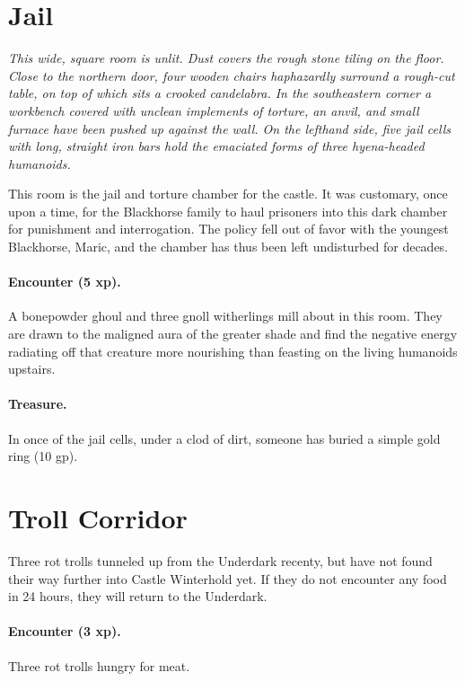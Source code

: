 \section{Jail}

\textit{This wide, square room is unlit. Dust covers the rough stone tiling on the floor.
Close to the northern door, four wooden chairs haphazardly surround a rough-cut table,
on top of which sits a crooked candelabra. In the southeastern corner a workbench
covered with unclean implements of torture, an anvil, and small furnace have been
pushed up against the wall. On the lefthand side, five jail cells with long, straight
iron bars hold the emaciated forms of three hyena-headed humanoids.}

This room is the jail and torture chamber for the castle. It was customary, once
upon a time, for the Blackhorse family to haul prisoners into this dark chamber
for punishment and interrogation. The policy fell out of favor with the youngest
Blackhorse, Maric, and the chamber has thus been left undisturbed for decades.

\paragraph{Encounter (5 xp).} A bonepowder ghoul and three gnoll witherlings
mill about in this room. They are drawn to the maligned aura of the greater shade
and find the negative energy radiating off that creature more nourishing than
feasting on the living humanoids upstairs.

\paragraph{Treasure.} In once of the jail cells, under a clod of dirt, someone
has buried a simple gold ring (10 gp).

\section{Troll Corridor}

Three rot trolls tunneled up from the Underdark recenty, but have not found their
way further into Castle Winterhold yet. If they do not encounter any food in 24 hours,
they will return to the Underdark.

\paragraph{Encounter (3 xp).} Three rot trolls hungry for meat.

